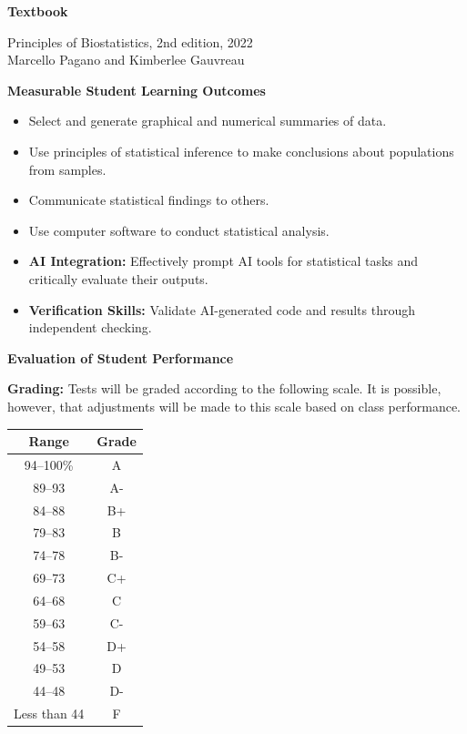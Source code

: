 \documentclass[11pt]{article}
\begin{document}
\noindent\textbf{Textbook}

Principles of Biostatistics, 2nd edition, 2022\\
Marcello Pagano and Kimberlee Gauvreau

\vspace{8pt}

\noindent\textbf{Measurable Student Learning Outcomes}

\begin{itemize}[leftmargin=20pt]
\item Select and generate graphical and numerical summaries of data.
\item Use principles of statistical inference to make conclusions about populations from samples.
\item Communicate statistical findings to others.
\item Use computer software to conduct statistical analysis.
\item \textcolor{aiblue}{\textbf{AI Integration:} Effectively prompt AI tools for statistical tasks and critically evaluate their outputs.}
\item \textcolor{aiblue}{\textbf{Verification Skills:} Validate AI-generated code and results through independent checking.}
\end{itemize}

\vspace{8pt}

\noindent\textbf{Evaluation of Student Performance}

\textbf{Grading:} Tests will be graded according to the following scale. It is possible, however, that adjustments will be made to this scale based on class performance.

\vspace{4pt}

\begin{center}
\begin{tabular}{cc}
\toprule
Range & Grade \\
\midrule
94--100\% & A \\
89--93 & A- \\
84--88 & B+ \\
79--83 & B \\
74--78 & B- \\
69--73 & C+ \\
64--68 & C \\
59--63 & C- \\
54--58 & D+ \\
49--53 & D \\
44--48 & D- \\
Less than 44 & F \\
\bottomrule
\end{tabular}
\end{center}
\end{document}
